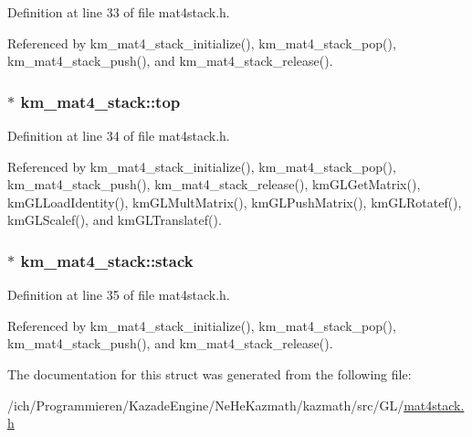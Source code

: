 Definition at line 33 of file mat4stack.h.

Referenced by km\_\-mat4\_\-stack\_\-initialize(), km\_\-mat4\_\-stack\_\-pop(), km\_\-mat4\_\-stack\_\-push(), and km\_\-mat4\_\-stack\_\-release().\hypertarget{structkm__mat4__stack_487ba8aa0a0176eb21899bd8bc38f153}{
\subsubsection[top]{$\ast$ {\bf km\_\-mat4\_\-stack::top}}}
\label{structkm__mat4__stack_487ba8aa0a0176eb21899bd8bc38f153}




Definition at line 34 of file mat4stack.h.

Referenced by km\_\-mat4\_\-stack\_\-initialize(), km\_\-mat4\_\-stack\_\-pop(), km\_\-mat4\_\-stack\_\-push(), km\_\-mat4\_\-stack\_\-release(), kmGLGetMatrix(), kmGLLoadIdentity(), kmGLMultMatrix(), kmGLPushMatrix(), kmGLRotatef(), kmGLScalef(), and kmGLTranslatef().\hypertarget{structkm__mat4__stack_a8b2b968718d212c80d7923d9de6a0a8}{
\subsubsection[stack]{$\ast$ {\bf km\_\-mat4\_\-stack::stack}}}
\label{structkm__mat4__stack_a8b2b968718d212c80d7923d9de6a0a8}




Definition at line 35 of file mat4stack.h.

Referenced by km\_\-mat4\_\-stack\_\-initialize(), km\_\-mat4\_\-stack\_\-pop(), km\_\-mat4\_\-stack\_\-push(), and km\_\-mat4\_\-stack\_\-release().

The documentation for this struct was generated from the following file:\begin{CompactItemize}
\item 
/ich/Programmieren/KazadeEngine/NeHeKazmath/kazmath/src/GL/\hyperlink{mat4stack_8h}{mat4stack.h}\end{CompactItemize}
